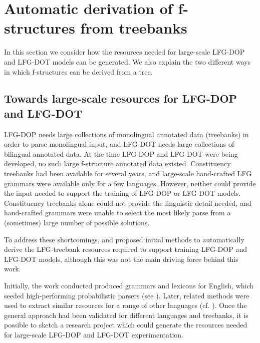 \documentclass[output=paper,hidelinks]{langscibook}
\begin{document}
\section{Automatic derivation of f-structures from treebanks }
In this section we consider how the resources needed for large-scale LFG-DOP and LFG-DOT models can be generated. We also explain the two different ways in which f-structures can be derived from a tree.

\subsection{Towards large-scale resources for LFG-DOP and LFG-DOT}
LFG-DOP needs large collections of monolingual annotated data
(treebanks) in order to parse monolingual input, and LFG-DOT needs large
collections of bilingual annotated data. At the time LFG-DOP and LFG-DOT were being developed, no such large f-structure annotated data existed. Constituency treebanks had been available for several years, and large-scale hand-crafted LFG grammars were available only for a few languages. However, neither could provide the input needed to support the training of LFG-DOP or LFG-DOT models. Constituency treebanks alone could not provide the linguistic detail needed, and  hand-crafted grammars were unable to select the most likely parse from a (sometimes) large number of possible solutions. 

To address these shortcomings, \citet{van1999semi} and \citet{van1999deriving} proposed initial methods to automatically derive the LFG-treebank resources required to support training LFG-DOP and LFG-DOT models, although this was not the main driving force behind this work. 

Initially, the work conducted produced grammars and lexicons for English, which seeded high-performing probabilistic parsers (see ). Later, related methods were used to extract similar resources for a range of other languages (cf. ). Once the general approach had been validated for  different languages and treebanks, it is possible to sketch a research project which could generate the resources needed for large-scale LFG-DOP and LFG-DOT experimentation. 
\end{document}
